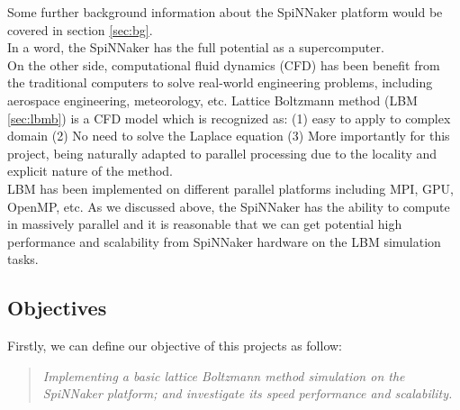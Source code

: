 Some further background information about the SpiNNaker platform would be covered in section \ref{sec:bg}. \\

In a word, the SpiNNaker has the full potential as a supercomputer. \\
 
On the other side, computational fluid dynamics (CFD) has been benefit from the traditional computers to solve real-world engineering problems, including aerospace engineering, meteorology, etc. Lattice Boltzmann method (LBM \ref{sec:lbmb}) is a CFD model which is recognized\cite{lbmmbook} as: (1) easy to apply to complex domain (2) No need to solve the Laplace equation (3) More importantly for this project, being naturally adapted to parallel processing due to the locality and explicit nature of the method. \\
 
LBM has been implemented on different parallel platforms including MPI\cite{he1999three}, GPU\cite{rogers1990upwind}, OpenMP\cite{massaioli2002achieving}, etc. As we discussed above, the SpiNNaker has the ability to compute in massively parallel and it is reasonable that we can get potential high performance and scalability from SpiNNaker hardware on the LBM simulation tasks.
\\


\subsection{Objectives} \label{sec:Obj}

Firstly, we can define our objective of this projects as follow:\\

\begin{quote}
\textit{Implementing a basic lattice Boltzmann method simulation on the SpiNNaker platform; and investigate its speed performance and scalability. \\
}\end{quote}



